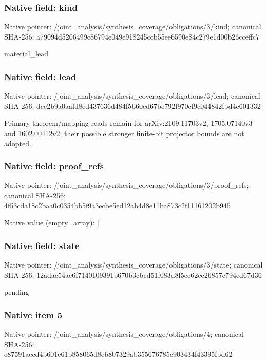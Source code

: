 \documentclass[10pt,a4paper]{article}
\begin{document}
\subsubsection{Native field: kind}
Native pointer: /joint\_\allowbreak{}analysis/synthesis\_\allowbreak{}coverage/obligations/3/kind; canonical SHA-256: a79094d5206499c86794e049e918245ccb55ee6590e84c279e1d00b26cceffc7

\begingroup\raggedright\sloppy material\_\allowbreak{}lead\par\endgroup

\subsubsection{Native field: lead}
Native pointer: /joint\_\allowbreak{}analysis/synthesis\_\allowbreak{}coverage/obligations/3/lead; canonical SHA-256: dce2b9a0aafd8ed437636d484f5b60cd67be792f970cf9c044842fbd4c601332

\begingroup\raggedright\sloppy Primary theorem/\allowbreak{}mapping reads remain for arXiv:\allowbreak{}2109.11703v2,\allowbreak{} 1705.07140v3 and 1602.00412v2;\allowbreak{} their possible stronger finite-bit projector bounds are not adopted.\par\endgroup

\subsubsection{Native field: proof\_\allowbreak{}refs}
Native pointer: /joint\_\allowbreak{}analysis/synthesis\_\allowbreak{}coverage/obligations/3/proof\_\allowbreak{}refs; canonical SHA-256: 4f53cda18c2baa0c0354bb5f9a3ecbe5ed12ab4d8e11ba873c2f11161202b945

Native value (empty\_\allowbreak{}array): []

\subsubsection{Native field: state}
Native pointer: /joint\_\allowbreak{}analysis/synthesis\_\allowbreak{}coverage/obligations/3/state; canonical SHA-256: 12adac54ac6f7140109391b670b3cbcd51f083d8f5ee62ce26857c794ed67d36

\begingroup\raggedright\sloppy pending\par\endgroup

\subsubsection{Native item 5}
Native pointer: /joint\_\allowbreak{}analysis/synthesis\_\allowbreak{}coverage/obligations/4; canonical SHA-256: e87591aecd4b601e61b858065d8eb807329ab355676785c903434f43395fbd62
\end{document}
